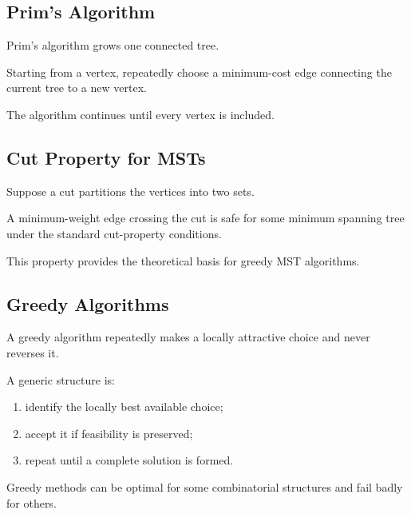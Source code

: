 \subsection{Prim's Algorithm}
\label{subsec:prims-algorithm}

Prim's algorithm grows one connected tree.

Starting from a vertex, repeatedly choose a minimum-cost edge connecting
the current tree to a new vertex.

The algorithm continues until every vertex is included.

\subsection{Cut Property for MSTs}
\label{subsec:mst-cut-property}

Suppose a cut partitions the vertices into two sets.

A minimum-weight edge crossing the cut is safe for some minimum spanning
tree under the standard cut-property conditions.

This property provides the theoretical basis for greedy MST algorithms.

\subsection{Greedy Algorithms}
\label{subsec:greedy-combinatorial}

A greedy algorithm repeatedly makes a locally attractive choice and never
reverses it.

A generic structure is:

\begin{enumerate}
    \item identify the locally best available choice;
    \item accept it if feasibility is preserved;
    \item repeat until a complete solution is formed.
\end{enumerate}

Greedy methods can be optimal for some combinatorial structures and fail
badly for others.

